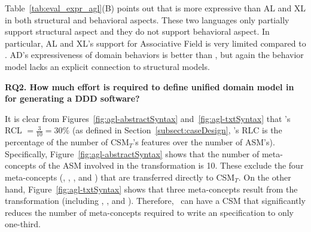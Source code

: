 Table~\ref{tab:eval_expr_agl}(B) points out that \agldcsl is more expressive than AL and XL in both structural and behavioral aspects. These two languages only partially support structural aspect and they do not support behavioral aspect. In particular, AL and XL's support for Associative Field is very limited compared to \agldcsl. AD's expressiveness of domain behaviors is better than \agl, but again the behavior model lacks an explicit connection to structural models.


\noindent \textbf{RQ2. How much effort is required to define unified domain model in \agldcsl for generating a DDD software?}


It is clear from Figures~\ref{fig:agl-abstractSyntax} and~\ref{fig:agl-txtSyntax} that \agl's RCL $ = \frac{3}{10}=30\%$ (as defined in Section~\ref{subsect:caseDesign}, \agl's RLC is the percentage of the number of CSM$_T$'s features over the number of ASM's). Specifically, Figure~\ref{fig:agl-abstractSyntax} shows that the number of meta-concepts of the ASM involved in the transformation is 10. These exclude the four meta-concepts (, , , and ) that are transferred directly to CSM$_T$. On the other hand, Figure~\ref{fig:agl-txtSyntax} shows that three meta-concepts result from the transformation (including , , and ). Therefore, \agl~can have a CSM that significantly reduces the number of meta-concepts required to write an \agl specification to only one-third. 


